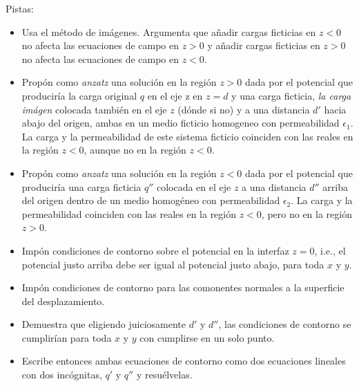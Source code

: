\documentclass{exam}
\begin{document}
\begin{questions}
  Pistas:
  \begin{itemize}
  \item Usa el método de imágenes. Argumenta que añadir cargas
    ficticias en $z<0$ no afecta las ecuaciones de campo en $z>0$ y
    añadir cargas ficticias en $z>0$ no afecta las ecuaciones de campo
    en $z<0$.
  \item Propón como {\em anzatz} una solución en la región $z>0$ dada
    por el potencial que produciría la carga original $q$ en el eje z
    en $z=d$ y una carga ficticia, {\em la carga imágen} colocada
    también en el eje $z$ (dónde si no) y a una distancia $d'$ hacia
    abajo del origen, ambas en un medio ficticio homogeneo con
    permeabilidad $\epsilon_1$. La carga y la permeabilidad de este
    sistema ficticio coinciden con las reales en la región $z<0$,
    aunque no en la región $z<0$.
  \item Propón como {\em anzatz} una solución en la región $z<0$ dada
    por el potencial que produciría una carga ficticia $q''$ colocada
    en el eje $z$ a una distancia $d''$ arriba del origen dentro de un
    medio homogéneo con permeabilidad $\epsilon_2$. La carga y la
    permeabilidad coinciden con las reales en la región $z<0$, pero no
    en la región $z>0$.
  \item Impón condiciones de contorno sobre el potencial en la
    interfaz $z=0$, i.e., el potencial justo arriba debe ser igual al
    potencial justo abajo, para toda $x$ y $y$.
  \item Impón condiciones de contorno para las comonentes normales a
    la superficie del desplazamiento.
  \item Demuestra que eligiendo juiciosamente $d'$ y $d''$, las
    condiciones de contorno se cumplirían para toda $x$ y $y$ con
    cumplirse en un solo punto.
  \item Escribe entonces ambas ecuaciones de contorno como dos
    ecuaciones lineales con dos incógnitas, $q'$ y $q''$ y
    resuélvelas.
  \end{itemize}
\end{questions}
\end{document}
